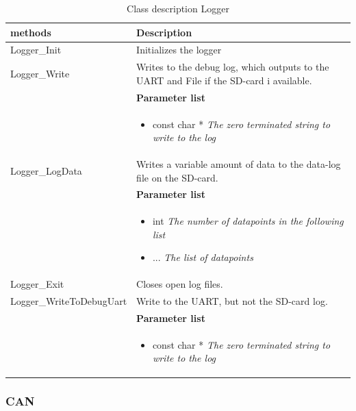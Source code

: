\begin{table}[H]
	\centering
	\begin{tabular}{|p{5 cm}|p{10 cm}|}
		\hline
		\textbf{methods} & \textbf{Description} \\ \hline
		
		Logger\_Init & Initializes the logger \\ \hline
				
		Logger\_Write
		&  Writes to the debug log, which outputs to the UART and File if the SD-card i available.
		\\ & \textbf{Parameter list}
		\\ & \begin{itemize}
			\item {\large const char *}
			\subitem \textit{The zero terminated string to write to the log}
		\end{itemize}
		\\ \hline
				
		Logger\_LogData
		&  Writes a variable amount of data to the data-log file on the SD-card.
		\\ & \textbf{Parameter list}
		\\ & \begin{itemize}
			\item {\large int}
			\subitem \textit{The number of datapoints in the following list}
			\item {\large ...}
			\subitem \textit{The list of datapoints}
		\end{itemize}
		\\ \hline
		
		Logger\_Exit
		&  Closes open log files. \\ \hline
			
		Logger\_WriteToDebugUart
		&  Write to the UART, but not the SD-card log.
		\\ & \textbf{Parameter list}
		\\ & \begin{itemize}
			\item {\large const char *}
			\subitem \textit{The zero terminated string to write to the log}
		\end{itemize}
		\\ \hline
	\end{tabular}
	\caption{Class description Logger}
	\label{table:Class_description_Logger_MCU}
\end{table}


\subsubsection{CAN}


